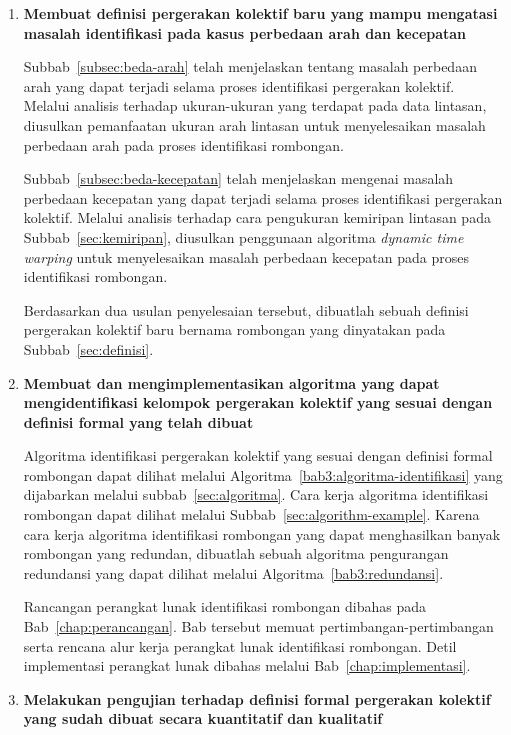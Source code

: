 \begin{enumerate}
    \item \textbf{Membuat definisi pergerakan kolektif baru yang mampu mengatasi masalah identifikasi pada kasus perbedaan arah dan kecepatan}
    
    Subbab~\ref{subsec:beda-arah} telah menjelaskan tentang masalah perbedaan arah yang dapat terjadi selama proses identifikasi pergerakan kolektif. Melalui analisis terhadap ukuran-ukuran yang terdapat pada data lintasan, diusulkan pemanfaatan ukuran arah lintasan untuk menyelesaikan masalah perbedaan arah pada proses identifikasi rombongan.
    
    Subbab~\ref{subsec:beda-kecepatan} telah menjelaskan mengenai masalah perbedaan kecepatan yang dapat terjadi selama proses identifikasi pergerakan kolektif. Melalui analisis terhadap cara pengukuran kemiripan lintasan pada Subbab~\ref{sec:kemiripan}, diusulkan penggunaan algoritma \textit{dynamic time warping} untuk menyelesaikan masalah perbedaan kecepatan pada proses identifikasi rombongan.
    
    Berdasarkan dua usulan penyelesaian tersebut, dibuatlah sebuah definisi pergerakan kolektif baru bernama rombongan yang dinyatakan pada Subbab~\ref{sec:definisi}.
    
    \item \textbf{Membuat dan mengimplementasikan algoritma yang dapat mengidentifikasi kelompok pergerakan kolektif yang sesuai dengan definisi formal yang telah dibuat}
    
    Algoritma identifikasi pergerakan kolektif yang sesuai dengan definisi formal rombongan dapat dilihat melalui Algoritma~\ref{bab3:algoritma-identifikasi} yang dijabarkan melalui subbab~\ref{sec:algoritma}. Cara kerja algoritma identifikasi rombongan dapat dilihat melalui Subbab~\ref{sec:algorithm-example}. Karena cara kerja algoritma identifikasi rombongan yang dapat menghasilkan banyak rombongan yang redundan, dibuatlah sebuah algoritma pengurangan redundansi yang dapat dilihat melalui Algoritma~\ref{bab3:redundansi}.
    
    Rancangan perangkat lunak identifikasi rombongan dibahas pada Bab~\ref{chap:perancangan}. Bab tersebut memuat pertimbangan-pertimbangan serta rencana alur kerja perangkat lunak identifikasi rombongan. Detil implementasi perangkat lunak dibahas melalui Bab~\ref{chap:implementasi}.
    
    \item \textbf{Melakukan pengujian terhadap definisi formal pergerakan kolektif yang sudah dibuat secara kuantitatif dan kualitatif}
    

\end{enumerate}
